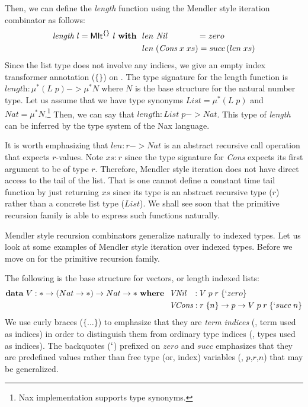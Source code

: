 Then, we can define the \textit{length} function using the Mendler style
iteration combinator as follows:
\begin{align*}
\textit{length}~l = \textsf{MIt}^{\{\}}~l~\textbf{with}~~
&  len ~\textit{Nil}~~~~~~~~~~~ = zero \\
&  len \;(\textit{Cons}\;x\;xs) = succ\,(len\;xs)
\end{align*}
Since the list type does not involve any indices, we give an empty index
transformer annotation ($\{\}$) on \MIt. The type signature for the length
function is $\textit{length}:\mu^{*}(L\;p) -> \mu^{*}N$ where $N$ is the
base structure for the natural number type. Let us assume that we have
type synonyms $\textit{List} = \mu^{*}(L\;p)$ and
$\textit{Nat} = \mu^{*}N $.\footnote{Nax implementation supports type synonyms.}
Then, we can say that $\textit{length}:\textit{List}\;p -> \textit{Nat}$.
This type of \textit{length} can be inferred by the type system of
the Nax language.

It is worth emphasizing that $len : r -> \textit{Nat}$ is an abstract recursive
call operation that expects $r$-values. Note $xs:r$ since the type signature
for \textit{Cons} expects its first argument to be of type $r$. Therefore,
Mendler style iteration does not have direct access to the tail of the list.
That is one cannot define a constant time tail function by just returning
$xs$ since its type is an abstract recursive type ($r$) rather than
a concrete list type ($List$). We shall see soon that the primitive recursion
family is able to express such functions naturally.

Mendler style recursion combinators generalize naturally to indexed types.
Let us look at some examples of Mendler style iteration over indexed types.
Before we move on for the primitive recursion family.

The following is the base structure for vectors, or length indexed lists:
\begin{align*}
\textbf{data}~V : * -> (Nat -> *) -> Nat -> * ~\textbf{where}~~
& \textit{VNil}~~\, : V\;p\;r\;\{`zero\} \\
& \textit{VCons}    : r\;\{n\} -> p -> V\;p\;r\;\{`succ\;n\}
\end{align*}
We use curly braces ($\{\dots\}$) to emphasize that they are \emph{term indices}
(\ie, term used as indices) in order to distinguish them from ordinary
type indices (\ie, types used as indices). The backquotes ($`$) prefixed
on $zero$ and $succ$ emphasizes that they are predefined values rather than
free type (or, index) variables (\eg, $p$,$r$,$n$) that may be generalized.

